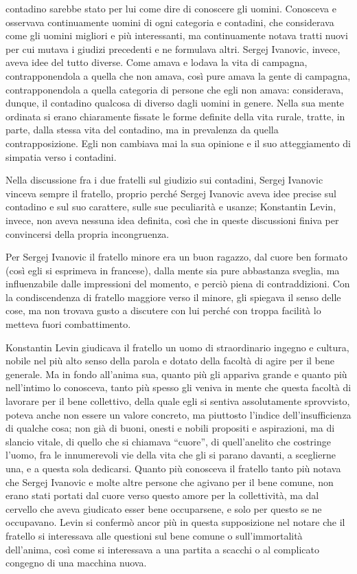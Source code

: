 contadino sarebbe stato per lui come dire di conoscere gli uomini. Conosceva e osservava continuamente uomini di ogni categoria e contadini, che considerava come gli uomini migliori e più interessanti, ma continuamente notava tratti nuovi per cui mutava i giudizi precedenti e ne formulava altri. Sergej Ivanovic, invece, aveva idee del tutto diverse. Come amava e lodava la vita di campagna, contrapponendola a quella che non amava, così pure amava la gente di campagna, contrapponendola a quella categoria di persone che egli non amava: considerava, dunque, il contadino qualcosa di diverso dagli uomini in genere. Nella sua mente ordinata si erano chiaramente fissate le forme definite della vita rurale, tratte, in parte, dalla stessa vita del contadino, ma in prevalenza da quella contrapposizione. Egli non cambiava mai la sua opinione e il suo atteggiamento di simpatia verso i contadini. 

Nella discussione fra i due fratelli sul giudizio sui contadini, Sergej Ivanovic vinceva sempre il fratello, proprio perché Sergej Ivanovic aveva idee precise sul contadino e sul suo carattere, sulle sue peculiarità e usanze; Konstantin Levin, invece, non aveva nessuna idea definita, così che in queste discussioni finiva per convincersi della propria incongruenza. 

Per Sergej Ivanovic il fratello minore era un buon ragazzo, dal cuore ben formato (così egli si esprimeva in francese), dalla mente sia pure abbastanza sveglia, ma influenzabile dalle impressioni del momento, e perciò piena di contraddizioni. Con la condiscendenza di fratello maggiore verso il minore, gli spiegava il senso delle cose, ma non trovava gusto a discutere con lui perché con troppa facilità lo metteva fuori combattimento. 

Konstantin Levin giudicava il fratello un uomo di straordinario ingegno e cultura, nobile nel più alto senso della parola e dotato della facoltà di agire per il bene generale. Ma in fondo all'anima sua, quanto più gli appariva grande e quanto più nell'intimo lo conosceva, tanto più spesso gli veniva in mente che questa facoltà di lavorare per il bene collettivo, della quale egli si sentiva assolutamente sprovvisto, poteva anche non essere un valore concreto, ma piuttosto l'indice dell'insufficienza di qualche cosa; non già di buoni, onesti e nobili propositi e aspirazioni, ma di slancio vitale, di quello che si chiamava ``cuore'', di quell'anelito che costringe l'uomo, fra le innumerevoli vie della vita che gli si parano davanti, a sceglierne una, e a questa sola dedicarsi. Quanto più conosceva il fratello tanto più notava che Sergej Ivanovic e molte altre persone che agivano per il bene comune, non erano stati portati dal cuore verso questo amore per la collettività, ma dal cervello che aveva giudicato esser bene occuparsene, e solo per questo se ne occupavano. Levin si confermò ancor più in questa supposizione nel notare che il fratello si interessava alle questioni sul bene comune o sull'immortalità dell'anima, così come si interessava a una partita a scacchi o al complicato congegno di una macchina nuova. 

